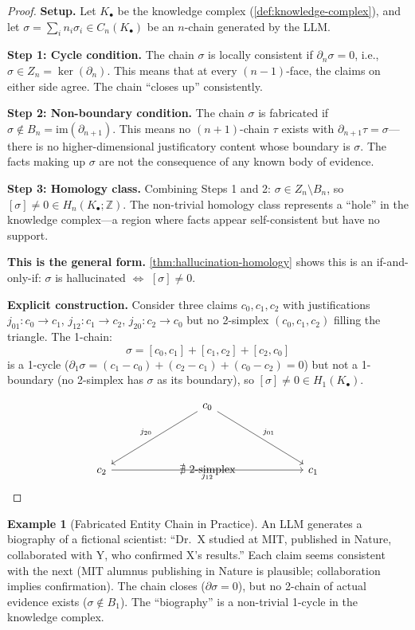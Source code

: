 \documentclass[11pt,a4paper]{article}
\theoremstyle{plain}
\theoremstyle{definition}
\newtheorem{example}[theorem]{Example}
\theoremstyle{remark}
\newcommand{\im}{\mathrm{im}}
\newcommand{\Z}{\mathbb{Z}}
\begin{document}
\begin{proof}
\textbf{Setup.} Let $K_\bullet$ be the knowledge complex (\cref{def:knowledge-complex}), and let $\sigma = \sum_i n_i \sigma_i \in C_n(K_\bullet)$ be an $n$-chain generated by the LLM.

\textbf{Step 1: Cycle condition.} The chain $\sigma$ is locally consistent if $\partial_n \sigma = 0$, i.e., $\sigma \in Z_n = \ker(\partial_n)$. This means that at every $(n-1)$-face, the claims on either side agree. The chain ``closes up'' consistently.

\textbf{Step 2: Non-boundary condition.} The chain $\sigma$ is fabricated if $\sigma \notin B_n = \im(\partial_{n+1})$. This means no $(n+1)$-chain $\tau$ exists with $\partial_{n+1} \tau = \sigma$---there is no higher-dimensional justificatory content whose boundary is $\sigma$. The facts making up $\sigma$ are not the consequence of any known body of evidence.

\textbf{Step 3: Homology class.} Combining Steps 1 and 2: $\sigma \in Z_n \setminus B_n$, so $[\sigma] \neq 0 \in H_n(K_\bullet; \Z)$. The non-trivial homology class represents a ``hole'' in the knowledge complex---a region where facts appear self-consistent but have no support.

\textbf{This is the general form.} \cref{thm:hallucination-homology} shows this is an if-and-only-if: $\sigma$ is hallucinated $\iff$ $[\sigma] \neq 0$.

\textbf{Explicit construction.} Consider three claims $c_0, c_1, c_2$ with justifications $j_{01}: c_0 \to c_1$, $j_{12}: c_1 \to c_2$, $j_{20}: c_2 \to c_0$ but no 2-simplex $(c_0, c_1, c_2)$ filling the triangle. The 1-chain:
\[
\sigma = [c_0, c_1] + [c_1, c_2] + [c_2, c_0]
\]
is a 1-cycle ($\partial_1 \sigma = (c_1 - c_0) + (c_2 - c_1) + (c_0 - c_2) = 0$) but not a 1-boundary (no 2-simplex has $\sigma$ as its boundary), so $[\sigma] \neq 0 \in H_1(K_\bullet)$.

\[
\begin{tikzcd}[column sep=2cm, row sep=1.5cm]
& c_0 \arrow[dl, "j_{20}"'] \arrow[dr, "j_{01}"] & \\
c_2 \arrow[rr, "j_{12}"'] & \nexists \text{ 2-simplex} & c_1
\end{tikzcd}
\]
\end{proof}

\begin{example}[Fabricated Entity Chain in Practice]
\label{ex:fabricated}
An LLM generates a biography of a fictional scientist: ``Dr.\ X studied at MIT, published in Nature, collaborated with Y, who confirmed X's results.'' Each claim seems consistent with the next (MIT alumnus publishing in Nature is plausible; collaboration implies confirmation). The chain closes ($\partial \sigma = 0$), but no 2-chain of actual evidence exists ($\sigma \notin B_1$). The ``biography'' is a non-trivial 1-cycle in the knowledge complex.
\end{example}
\end{document}
